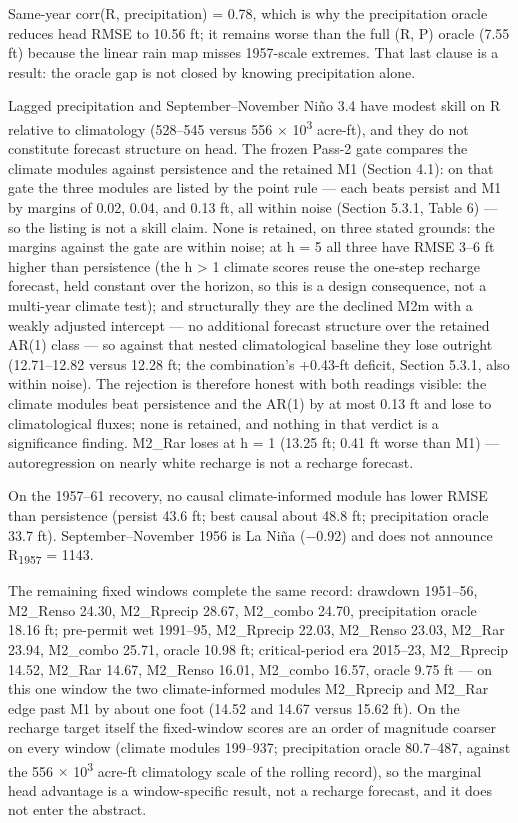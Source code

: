 \documentclass[11pt]{article}
\begin{document}
Same-year corr(R, precipitation) = 0.78, which is why the precipitation
oracle reduces head RMSE to 10.56 ft; it remains worse than the full (R,
P) oracle (7.55 ft) because the linear rain map misses 1957-scale
extremes. That last clause is a result: the oracle gap is not closed by
knowing precipitation alone.

Lagged precipitation and September--November Ni\~no 3.4 have modest skill
on R relative to climatology (528--545 versus 556 \ensuremath{\times} 10\textsuperscript{3} acre-ft), and
they do not constitute forecast structure on head. The frozen Pass-2
gate compares the climate modules against persistence and the retained
M1 (Section 4.1): on that gate the three modules are listed by the point
rule --- each beats persist and M1 by margins of 0.02, 0.04, and 0.13
ft, all within noise (Section 5.3.1, Table 6) --- so the listing is not
a skill claim. None is retained, on three stated grounds: the margins
against the gate are within noise; at h = 5 all three have RMSE 3--6 ft
higher than persistence (the h \textgreater{} 1 climate scores reuse the
one-step recharge forecast, held constant over the horizon, so this is a
design consequence, not a multi-year climate test); and structurally
they are the declined M2m with a weakly adjusted intercept --- no
additional forecast structure over the retained AR(1) class --- so
against that nested climatological baseline they lose outright
(12.71--12.82 versus 12.28 ft; the combination's +0.43-ft deficit,
Section 5.3.1, also within noise). The rejection is therefore honest
with both readings visible: the climate modules beat persistence and the
AR(1) by at most 0.13 ft and lose to climatological fluxes; none is
retained, and nothing in that verdict is a significance finding. M2\_Rar
loses at h = 1 (13.25 ft; 0.41 ft worse than M1) --- autoregression on
nearly white recharge is not a recharge forecast.

On the 1957--61 recovery, no causal climate-informed module has lower
RMSE than persistence (persist 43.6 ft; best causal about 48.8 ft;
precipitation oracle 33.7 ft). September--November 1956 is La Ni\~na
(\ensuremath{-}0.92) and does not announce R\textsubscript{1957} = 1143.

The remaining fixed windows complete the same record: drawdown 1951--56,
M2\_Renso 24.30, M2\_Rprecip 28.67, M2\_combo 24.70, precipitation
oracle 18.16 ft; pre-permit wet 1991--95, M2\_Rprecip 22.03, M2\_Renso
23.03, M2\_Rar 23.94, M2\_combo 25.71, oracle 10.98 ft; critical-period
era 2015--23, M2\_Rprecip 14.52, M2\_Rar 14.67, M2\_Renso 16.01,
M2\_combo 16.57, oracle 9.75 ft --- on this one window the two
climate-informed modules M2\_Rprecip and M2\_Rar edge past M1 by about
one foot (14.52 and 14.67 versus 15.62 ft). On the recharge target
itself the fixed-window scores are an order of magnitude coarser on
every window (climate modules 199--937; precipitation oracle 80.7--487,
against the 556 \ensuremath{\times} 10\textsuperscript{3} acre-ft climatology scale of the rolling record),
so the marginal head advantage is a window-specific result, not a
recharge forecast, and it does not enter the abstract.
\end{document}
